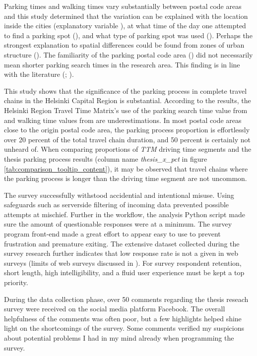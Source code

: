 Parking times and walking times vary substantially between postal code areas and this study determined that the variation can be explained with the location inside the cities (explanatory variable ), at what time of the day one attempted to find a parking spot (), and what type of parking spot was used (). Perhaps the strongest explanation to spatial differences could be found from zones of urban structure (). The familiarity of the parking postal code area () did not necessarily mean shorter parking search times in the research area. This finding is in line with the literature (\cite{Thompson1998}; \cite{Teng2002}).

This study shows that the significance of the parking process in complete travel chains in the Helsinki Capital Region is substantial. According to the results, the Helsinki Region Travel Time Matrix's use of the parking search time value from  and walking time values from  are underestimations. In most postal code areas close to the origin postal code area, the parking process proportion is effortlessly over 20 percent of the total travel chain duration, and 50 percent is certainly not unheard of. When comparing proportions of \textit{TTM} driving time segments and the thesis parking process results (column name \textit{thesis\_x\_pct} in figure \ref{tab:comparison_tooltip_content}), it may be observed that travel chains where the parking process is longer than the driving time segment are not uncommon. 

The survey successfully withstood accidential and intentional misuse. Using safeguards such as serverside filtering of incoming data prevented possible attempts at mischief. Further in the workflow, the analysis Python script made sure the amount of questionable responses were at a minimum. The survey program front-end made a great effort to appear easy to use to prevent frustration and premature exiting. The extensive dataset collected during the survey research further indicates that low response rate is not a given in web surveys (limits of web surveys discussed in ). For survey respondent retention, short length, high intelligibility, and a fluid user experience must be kept a top priority.

During the data collection phase, over 50 comments regarding the thesis reseach survey were received on the social media platform Facebook. The overall helpfulness of the comments was often poor, but a few highlights helped shine light on the shortcomings of the survey. Some comments verified my suspicions about potential problems I had in my mind already when programming the survey.

